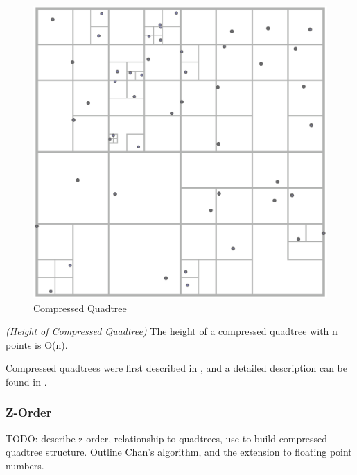 \documentclass[mcs]{scsthesis}
\begin{document}
\begin{figure}
\begin{center}
\includegraphics[scale=0.4]{diagrams/compressed_quadtree.eps}
\caption{Compressed Quadtree}
\end{center}
\end{figure}

\begin{thm} \emph{(Height of Compressed Quadtree)}
The height of a compressed quadtree with n points is O(n).
\end{thm}

Compressed quadtrees were first described in \cite{compressedquadtree}, and a
detailed description can be found in \cite{skipquadtree}.

\subsubsection{Z-Order}

TODO: describe z-order, relationship to quadtrees, use to build compressed
quadtree structure.  Outline Chan's algorithm, and the extension to
floating point numbers.
\end{document}
